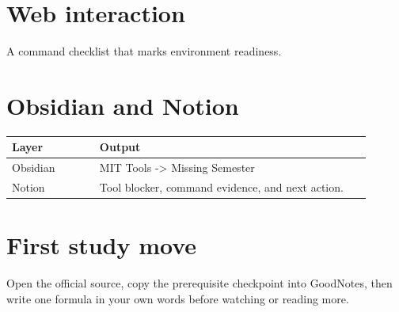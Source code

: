 \documentclass[11pt]{article}
\begin{document}
\section*{Web interaction}
A command checklist that marks environment readiness.

\section*{Obsidian and Notion}
\begin{tabular}{p{0.22\linewidth}p{0.68\linewidth}}
\toprule
Layer & Output \\
\midrule
Obsidian & MIT Tools -> Missing Semester \\
Notion & Tool blocker, command evidence, and next action. \\
\bottomrule
\end{tabular}

\section*{First study move}
Open the official source, copy the prerequisite checkpoint into GoodNotes, then write one formula in your own words before watching or reading more.
\end{document}
